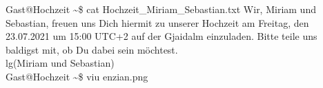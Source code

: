 \documentclass[12pt, a5paper]{article}
\begin{document}
\noindent
{\selectfont
\lbrack Gast@Hochzeit \textasciitilde\rbrack\$ cat Hochzeit\_Miriam\_Sebastian.txt
Wir, Miriam und Sebastian, freuen uns Dich hiermit zu unserer Hochzeit am Freitag, den 23.07.2021 um 15:00 UTC+2 auf der Gjaidalm einzuladen. Bitte teile uns baldigst mit, ob Du dabei sein möchtest.\\ lg(Miriam und Sebastian) \\
\lbrack Gast@Hochzeit \textasciitilde\rbrack\$ viu enzian.png\\
\vspace*{-40px}
\begin{figure}[H]
\end{figure}
}
\end{document}
